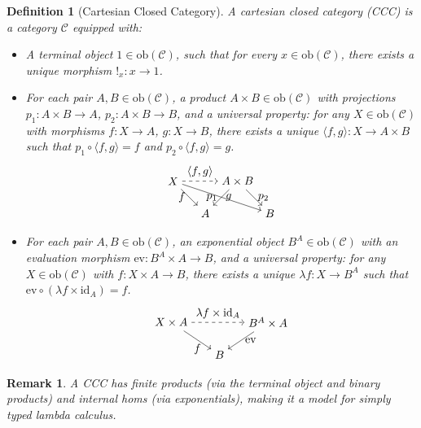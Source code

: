 \documentclass{article}
\theoremstyle{plain}
\newtheorem{definition}[theorem]{Definition}
\newtheorem*{remark}{Remark}
\theoremstyle{remark}
\begin{document}
\begin{definition}[Cartesian Closed Category]
A \emph{cartesian closed category} (CCC) is a category $\mathcal{C}$ equipped with:
\begin{itemize}
    \item A \emph{terminal object} $1 \in \mathrm{ob}(\mathcal{C})$, such that for every $x \in \mathrm{ob}(\mathcal{C})$, there exists a unique morphism $!_x : x \to 1$.
    \item For each pair $A, B \in \mathrm{ob}(\mathcal{C})$, a \emph{product} $A \times B \in \mathrm{ob}(\mathcal{C})$ with projections $p_1 : A \times B \to A$, $p_2 : A \times B \to B$, and a universal property: for any $X \in \mathrm{ob}(\mathcal{C})$ with morphisms $f : X \to A$, $g : X \to B$, there exists a unique $\langle f, g \rangle : X \to A \times B$ such that $p_1 \circ \langle f, g \rangle = f$ and $p_2 \circ \langle f, g \rangle = g$.
    \[
    \begin{tikzpicture}
        \node (X) at (0,1) {$X$};
        \node (AB) at (2,1) {$A \times B$};
        \node (A) at (1,0) {$A$};
        \node (B) at (3,0) {$B$};
        \draw[->, dashed] (X) to node[above] {$\langle f, g \rangle$} (AB);
        \draw[->] (X) to node[left] {$f$} (A);
        \draw[->] (X) to node[right] {$g$} (B);
        \draw[->] (AB) to node[left] {$p_1$} (A);
        \draw[->] (AB) to node[right] {$p_2$} (B);
    \end{tikzpicture}
    \]
    \item For each pair $A, B \in \mathrm{ob}(\mathcal{C})$, an \emph{exponential object} $B^A \in \mathrm{ob}(\mathcal{C})$ with an evaluation morphism $\mathrm{ev} : B^A \times A \to B$, and a universal property: for any $X \in \mathrm{ob}(\mathcal{C})$ with $f : X \times A \to B$, there exists a unique $\lambda f : X \to B^A$ such that $\mathrm{ev} \circ (\lambda f \times \mathrm{id}_A) = f$.
    \[
    \begin{tikzpicture}
        \node (XA) at (0,1) {$X \times A$};
        \node (BAxA) at (3,1) {$B^A \times A$};
        \node (B) at (1.5,0) {$B$};
        \draw[->, dashed] (XA) to node[above] {$\lambda f \times \mathrm{id}_A$} (BAxA);
        \draw[->] (XA) to node[below] {$f$} (B);
        \draw[->] (BAxA) to node[right] {$\mathrm{ev}$} (B);
    \end{tikzpicture}
    \]
\end{itemize}
\end{definition}

\begin{remark}
A CCC has finite products (via the terminal object and binary products) and internal homs (via exponentials), making it a model for simply typed lambda calculus.
\end{remark}
\end{document}
